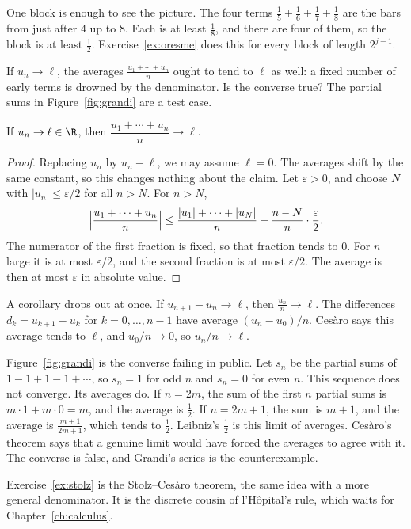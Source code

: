 One block is enough to see the picture. The four terms $\frac15+\frac16+\frac17+\frac18$ are the bars from just after $4$ up to $8$. Each is at least $\frac18$, and there are four of them, so the block is at least $\frac12$. Exercise~\ref{ex:oresme} does this for every block of length $2^{j-1}$.

\begin{think}
If $u_n\to\ell$, the averages $\frac{u_1+\cdots+u_n}n$ ought to tend to $\ell$ as well: a fixed number of early terms is drowned by the denominator. Is the converse true? The partial sums in Figure~\ref{fig:grandi} are a test case.
\end{think}

\begin{theorem}\label{thm:cesaro}
If $u_n\to\ell\in\R$, then $\dfrac{u_1+\cdots+u_n}n\to\ell$.
\end{theorem}
\begin{proof}
Replacing $u_n$ by $u_n-\ell$, we may assume $\ell=0$. The averages shift by the same constant, so this changes nothing about the claim. Let $\varepsilon>0$, and choose $N$ with $|u_n|\le\varepsilon/2$ for all $n>N$. For $n>N$,
\[
\Bigl|\frac{u_1+\cdots+u_n}n\Bigr|\le\frac{|u_1|+\cdots+|u_N|}n+\frac{n-N}n\cdot\frac\varepsilon2.
\]
The numerator of the first fraction is fixed, so that fraction tends to $0$. For $n$ large it is at most $\varepsilon/2$, and the second fraction is at most $\varepsilon/2$. The average is then at most $\varepsilon$ in absolute value.
\end{proof}

A corollary drops out at once. If $u_{n+1}-u_n\to\ell$, then $\frac{u_n}n\to\ell$. The differences $d_k=u_{k+1}-u_k$ for $k=0,\ldots,n-1$ have average $(u_n-u_0)/n$. Ces\`aro says this average tends to $\ell$, and $u_0/n\to0$, so $u_n/n\to\ell$.

Figure~\ref{fig:grandi} is the converse failing in public. Let $s_n$ be the partial sums of $1-1+1-1+\cdots$, so $s_n=1$ for odd $n$ and $s_n=0$ for even $n$. This sequence does not converge. Its averages do. If $n=2m$, the sum of the first $n$ partial sums is $m\cdot1+m\cdot0=m$, and the average is $\frac12$. If $n=2m+1$, the sum is $m+1$, and the average is $\frac{m+1}{2m+1}$, which tends to $\frac12$. Leibniz's $\frac12$ is this limit of averages. Ces\`aro's theorem says that a genuine limit would have forced the averages to agree with it. The converse is false, and Grandi's series is the counterexample.

Exercise~\ref{ex:stolz} is the Stolz--Ces\`aro theorem, the same idea with a more general denominator. It is the discrete cousin of l'H\^opital's rule, which waits for Chapter~\ref{ch:calculus}.

